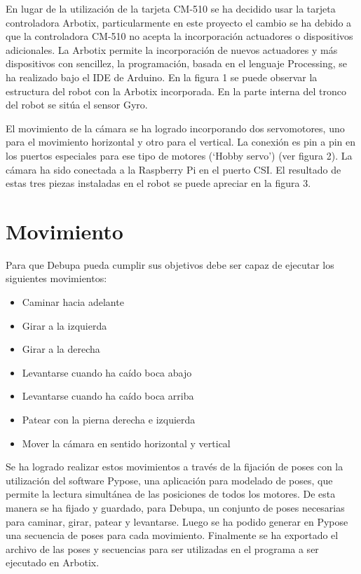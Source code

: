\documentclass[tikz,conference, letterpaper]{IEEEtranMC1}
\begin{document}
En lugar de la utilización de la tarjeta CM-510 se ha decidido usar la tarjeta controladora Arbotix, particularmente en este proyecto el cambio se ha debido a que la controladora CM-510 no acepta la incorporación actuadores o dispositivos adicionales. La Arbotix permite la incorporación de nuevos actuadores y más dispositivos con sencillez, la programación, basada en el lenguaje Processing, se ha realizado bajo el IDE de Arduino. En la figura 1 se puede observar la estructura del robot con la Arbotix incorporada. En la parte interna del tronco del robot se sitúa el sensor Gyro. 

El movimiento de la cámara se ha logrado incorporando dos servomotores, uno para el movimiento horizontal y otro para el vertical. La conexión es pin a pin en los puertos especiales para ese tipo de motores (‘Hobby servo’) \cite{trossen} (ver figura 2). La cámara ha sido conectada a la Raspberry Pi en el puerto CSI. El resultado de estas tres piezas instaladas en el robot se puede apreciar en la figura 3.



\section{Movimiento}
\label{sec:movimiento}


Para que Debupa pueda cumplir sus objetivos debe ser capaz de ejecutar los siguientes movimientos:
\begin{itemize}
\setlength{\itemsep}{1pt}
\item Caminar hacia adelante
\item Girar a la izquierda
\item Girar a la derecha
\item Levantarse cuando ha caído boca abajo
\item Levantarse cuando ha caído boca arriba 
\item Patear con la pierna derecha e izquierda
\item Mover la cámara en sentido horizontal y vertical 

 
\end{itemize}

Se ha logrado realizar estos movimientos a través de la fijación de poses con la utilización del software Pypose, una aplicación para modelado de poses, que permite la lectura simultánea de las posiciones de todos los motores. De esta manera se ha fijado y guardado, para Debupa, un conjunto de poses necesarias para caminar, girar, patear y levantarse. Luego se ha podido generar en Pypose una secuencia de poses para cada movimiento. Finalmente se ha exportado el archivo de las poses y secuencias para ser utilizadas en el programa a ser ejecutado en Arbotix. 
\end{document}
